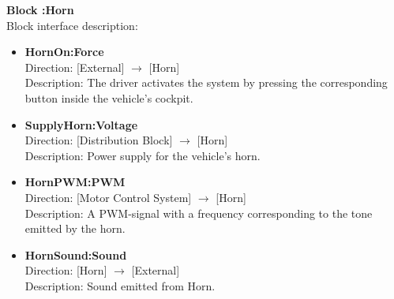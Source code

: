\textbf{Block :Horn}\\
Block interface description:
\begin{itemize}
	\item \textbf{HornOn:Force}\\
	Direction: [External] $\rightarrow$ [Horn]\\
	Description: The driver activates the system by pressing the corresponding button inside the vehicle's cockpit.
	\item \textbf{SupplyHorn:Voltage}\\
	Direction: [Distribution Block] $\rightarrow$ [Horn]\\
	Description: Power supply for the vehicle's horn.
	\item \textbf{HornPWM:PWM}\\
	Direction: [Motor Control System] $\rightarrow$ [Horn]\\
	Description: A PWM-signal with a frequency corresponding to the tone emitted by the horn.
	\item \textbf{HornSound:Sound}\\
	Direction: [Horn] $\rightarrow$ [External]\\
	Description: Sound emitted from Horn.
\end{itemize}


